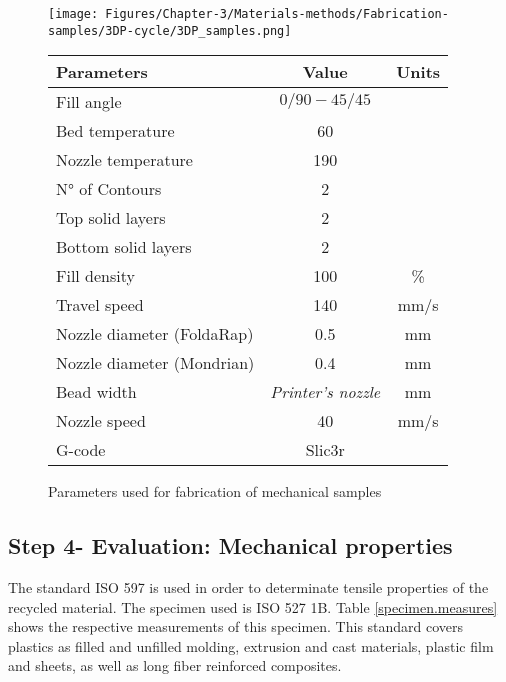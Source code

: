 \begin{enumerate}[leftmargin=0in, label=\emph{\alph*}.]
\begin{figure}[H]
		\texttt{[image: Figures/Chapter-3/Materials-methods/Fabrication-samples/3DP-cycle/3DP\_samples.png]}
		\qquad
		\begin{adjustbox}{max width=8cm}
			\begin{tabular}[b]{lcc}
				\toprule
				\textbf{Parameters } & \textbf{Value } & \textbf{Units} \\
				\midrule
				Fill angle					& $0/90 - 45/45$  &		\\
				Bed temperature  	& 60  &	\Celsius			\\
				Nozzle temperature	& 190  & \Celsius		\\
				N° of Contours	& 2 	& 				\\
				Top solid layers		&2	&				\\
				Bottom solid layers		& 2	&			\\
				Fill density					 & 100  & \% 		\\
				Travel speed				& 140  & mm/s		\\
				Nozzle diameter	(FoldaRap)		& 0.5  & mm		\\
				Nozzle diameter	(Mondrian)		& 0.4  & mm		\\
				Bead width 	& \textit{Printer's nozzle}  & mm		\\
				Nozzle speed		& 40  & mm/s		\\
				G-code  & Slic3r & \\
				\bottomrule
			\end{tabular}
		\end{adjustbox}
		
		\caption{Parameters used for fabrication of mechanical samples}
		\label{specimen.3DP}
	\end{figure}
	
\end{enumerate}




\subsection{Step 4- Evaluation: Mechanical properties}
\label{Subsection:Evaluation.PLA}

The standard ISO 597 is used in order to determinate tensile properties of the recycled material.  
The specimen used is ISO 527 1B. Table \ref{specimen.measures} shows the respective measurements of this specimen.
This standard covers plastics as filled and unfilled molding, extrusion and cast materials, plastic film and sheets, as well as long fiber reinforced composites.

